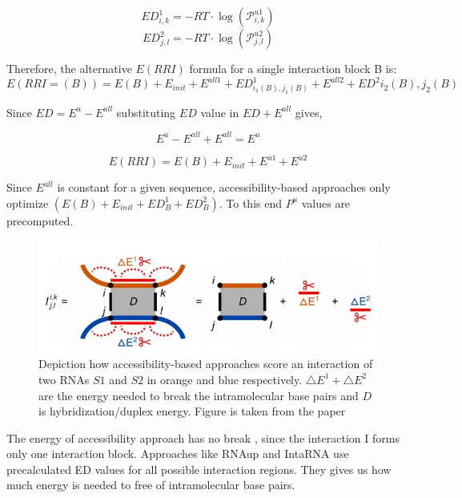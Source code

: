 \documentclass[twoside,a4paper]{report}
\numberwithin{equation}{section}
\begin{document}
	 \begin{equation}
	\label{eq:equ8}	
	ED^{1}_{i,k} = - RT \cdot \log(\mathcal{P}^{u1}_{i,k})
	\end{equation}
		 \begin{equation}
	\label{eq:equ9}	
	ED^{2}_{j,l} =  - RT \cdot \log(\mathcal{P}^{u2}_{j,l})
	\end{equation}

	
	Therefore, the alternative $E(RRI)$ formula for a single interaction block B is:\\
	\begin{equation}
	E(RRI =(B)) = E(B) + E_{init} + E^{all1} + ED^1_{i_1(B),j_1(B)} + E^{all2} + ED^2{i_2(B),j_2(B)}
	\end{equation} 
	
 	Since $ED = E^u - E ^{all}$ substituting $ED$ value in  $ED + E^{all}$ gives,
	
	\begin{center}
		\[
	 E^u - E ^{all}+ E^{all}
	  = E^{u}
	  \]
	 \end{center}
	 \begin{equation}
	 \label{eq:equ11}
	 E(RRI) = E(B) + E_{init} + E^{u1} + E^{u2}
	 \end{equation}
	
	Since $E ^{all}$ is constant for a given sequence, accessibility-based approaches only optimize $(E(B) + E_{init} + ED^1_B +ED^2_B)$. To this end $P^u$ values are precomputed.\\
	
	\begin{figure}[tb]
		\includegraphics[width=0.9\linewidth]{access}
		\centering
		\caption{ Depiction how accessibility-based approaches score an interaction of two RNAs $S1$ and $S2$ in orange and blue respectively. $\triangle E^1 + \triangle E^2$ are the energy needed to break the intramolecular base pairs and $D$ is hybridization/duplex energy. Figure is taken from the paper \citep{raden2018interactive}} 
		\label{fig:access}
	\end{figure}
	

	The energy of accessibility approach has no break , since the interaction I forms only one interaction block. Approaches like RNAup and IntaRNA use precalculated ED values for all possible interaction regions. They gives us how much energy is needed to free of intramolecular base pairs. \\
	
\end{document}
